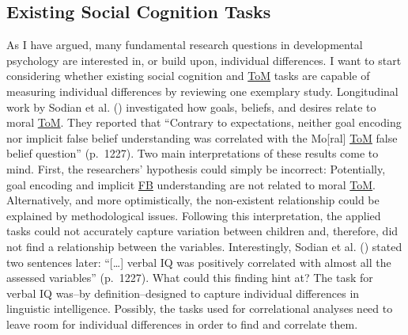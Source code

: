 \documentclass[
]{scrbook}
\begin{document}
\subsection{Existing Social Cognition Tasks}\label{existing-social-cognition-tasks}

As I have argued, many fundamental research questions in developmental psychology are interested in, or build upon, individual differences. I want to start considering whether existing social cognition and \hyperref[acronyms_ToM]{ToM} tasks are capable of measuring individual differences by reviewing one exemplary study. Longitudinal work by Sodian et al. () investigated how goals, beliefs, and desires relate to moral \hyperref[acronyms_ToM]{ToM}. They reported that ``Contrary to expectations, neither goal encoding nor implicit false belief understanding was correlated with the Mo{[}ral{]} \hyperref[acronyms_ToM]{ToM} false belief question'' (p.~1227). Two main interpretations of these results come to mind. First, the researchers' hypothesis could simply be incorrect: Potentially, goal encoding and implicit \hyperref[acronyms_FB]{FB} understanding are not related to moral \hyperref[acronyms_ToM]{ToM}. Alternatively, and more optimistically, the non-existent relationship could be explained by methodological issues. Following this interpretation, the applied tasks could not accurately capture variation between children and, therefore, did not find a relationship between the variables. Interestingly, Sodian et al. () stated two sentences later: ``{[}\ldots{]} verbal IQ was positively correlated with almost all the assessed variables'' (p.~1227). What could this finding hint at? The task for verbal IQ was\thinspace --\thinspace by definition\thinspace --\thinspace designed to capture individual differences in linguistic intelligence. Possibly, the tasks used for correlational analyses need to leave room for individual differences in order to find and correlate them.
\end{document}
